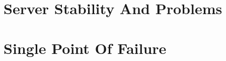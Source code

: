 \newpage
\section{Server Stability And Problems}
\label{section:Server Stability And Problems}


\newpage
\section{Single Point Of Failure}
\label{section:Single Point Of Failure}











%
%
%
%
%
%
